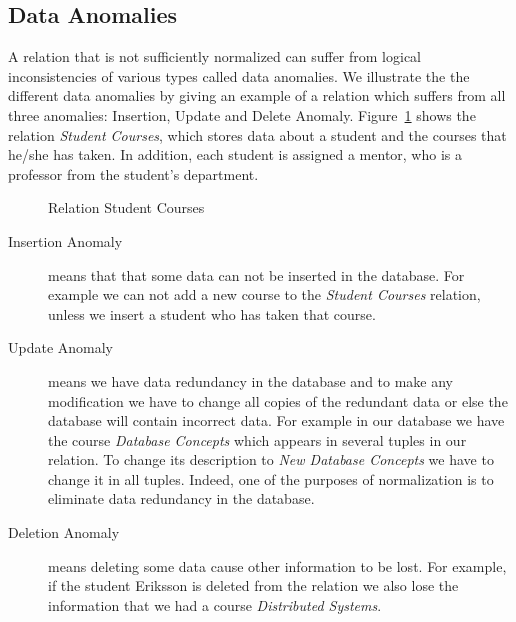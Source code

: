 \subsection{Data Anomalies}
A relation that is not sufficiently normalized can suffer from logical inconsistencies of various types
called data anomalies. We illustrate the the different data anomalies by
giving an example of a relation which suffers from all three anomalies: Insertion, Update and
Delete Anomaly. Figure~\ref{fig:relsc1nf}
shows the relation \textit{Student Courses}, which stores data about a student and the courses 
that he/she has taken. In addition, each student is assigned a mentor, who is 
a professor from the student's department. 


%    

\begin{figure}
\begin{center}

\caption{Relation Student Courses}\label{fig:relsc1nf}
\end{center}
\end{figure}

\begin{description}
  \item[Insertion Anomaly] means that that some data can not be 
    inserted in the database. For example we can not add a new course to the \textit{Student Courses}
    relation, unless we insert a student who has taken that course.
  \item[Update Anomaly] means we have data redundancy in the database and to make any 
    modification we have to change all copies of the redundant data or else the 
    database will contain incorrect data. For example in our database we have the course 
    \textit{Database Concepts} which appears in several tuples in our relation. 
    To change its description to \textit{New Database Concepts} we have to change 
    it in all tuples. Indeed, one of the purposes of normalization is to eliminate data 
    redundancy in the database.
  \item[Deletion Anomaly] means deleting some data cause other information to be lost. 
    For example, if the student Eriksson is deleted from the relation we also lose the 
    information that we had a course \textit{Distributed Systems}.
\end{description}

